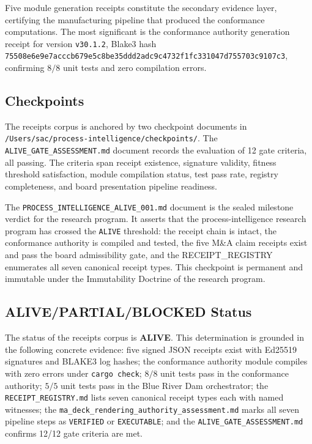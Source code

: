 Five module generation receipts constitute the secondary evidence layer, certifying
the manufacturing pipeline that produced the conformance computations. The most
significant is the conformance authority generation receipt for version \texttt{v30.1.2},
Blake3 hash \texttt{75508e6e9e7acccb679e5c8be35ddd2adc9c4732f1fc331047d755703c9107c3},
confirming $8/8$ unit tests and zero compilation errors.

\subsection{Checkpoints}
\label{sec:receipts-evidence-checkpoints}

The receipts corpus is anchored by two checkpoint documents in
\texttt{/Users/sac/process-intelligence/checkpoints/}. The
\texttt{ALIVE\_GATE\_ASSESSMENT.md} document records the evaluation of 12 gate criteria,
all passing. The criteria span receipt existence, signature validity, fitness threshold
satisfaction, module compilation status, test pass rate, registry completeness, and
board presentation pipeline readiness.

The \texttt{PROCESS\_INTELLIGENCE\_ALIVE\_001.md} document is the sealed milestone
verdict for the research program. It asserts that the process-intelligence research
program has crossed the \texttt{ALIVE} threshold: the receipt chain is intact, the
conformance authority is compiled and tested, the five M\&A claim receipts exist and
pass the board admissibility gate, and the RECEIPT\_REGISTRY enumerates all seven
canonical receipt types. This checkpoint is permanent and immutable under the
Immutability Doctrine of the research program.

\subsection{ALIVE/PARTIAL/BLOCKED Status}
\label{sec:receipts-evidence-status}

The status of the receipts corpus is \textbf{ALIVE}. This determination is grounded
in the following concrete evidence: five signed JSON receipts exist with Ed25519
signatures and BLAKE3 log hashes; the conformance authority module compiles with
zero errors under \texttt{cargo check}; $8/8$ unit tests pass in the conformance
authority; $5/5$ unit tests pass in the Blue River Dam orchestrator; the
\texttt{RECEIPT\_REGISTRY.md} lists seven canonical receipt types each with named
witnesses; the \texttt{ma\_deck\_rendering\_authority\_assessment.md} marks all
seven pipeline steps as \texttt{VERIFIED} or \texttt{EXECUTABLE}; and the
\texttt{ALIVE\_GATE\_ASSESSMENT.md} confirms 12/12 gate criteria are met.

